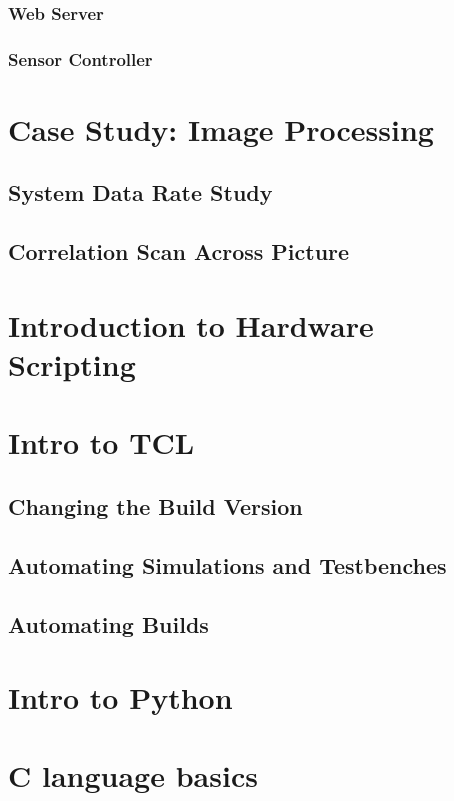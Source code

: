 \documentclass[]{book}
\begin{document}
\subsubsection{Web Server}
\subsubsection{Sensor Controller}
\section{Case Study: Image Processing}
\subsection{System Data Rate Study}
\subsection{Correlation Scan Across Picture}

\section{Introduction to Hardware Scripting}
\section{Intro to TCL}
\subsection{Changing the Build Version}
\subsection{Automating Simulations and Testbenches}
\subsection{Automating Builds}
\section{Intro to Python}
\section{C language basics}
\end{document}
